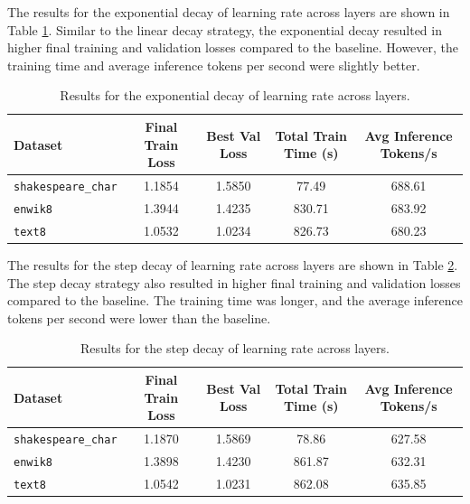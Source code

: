 \documentclass{article} %
\begin{document}
The results for the exponential decay of learning rate across layers are shown in Table \ref{tab:exponential-decay-results}. Similar to the linear decay strategy, the exponential decay resulted in higher final training and validation losses compared to the baseline. However, the training time and average inference tokens per second were slightly better.

\begin{table}[h]
    \centering
    \begin{tabular}{lcccc}
        \toprule
        Dataset & Final Train Loss & Best Val Loss & Total Train Time (s) & Avg Inference Tokens/s \\
        \midrule
        \texttt{shakespeare\_char} & 1.1854 & 1.5850 & 77.49 & 688.61 \\
        \texttt{enwik8} & 1.3944 & 1.4235 & 830.71 & 683.92 \\
        \texttt{text8} & 1.0532 & 1.0234 & 826.73 & 680.23 \\
        \bottomrule
    \end{tabular}
    \caption{Results for the exponential decay of learning rate across layers.}
    \label{tab:exponential-decay-results}
\end{table}

The results for the step decay of learning rate across layers are shown in Table \ref{tab:step-decay-results}. The step decay strategy also resulted in higher final training and validation losses compared to the baseline. The training time was longer, and the average inference tokens per second were lower than the baseline.

\begin{table}[h]
    \centering
    \begin{tabular}{lcccc}
        \toprule
        Dataset & Final Train Loss & Best Val Loss & Total Train Time (s) & Avg Inference Tokens/s \\
        \midrule
        \texttt{shakespeare\_char} & 1.1870 & 1.5869 & 78.86 & 627.58 \\
        \texttt{enwik8} & 1.3898 & 1.4230 & 861.87 & 632.31 \\
        \texttt{text8} & 1.0542 & 1.0231 & 862.08 & 635.85 \\
        \bottomrule
    \end{tabular}
    \caption{Results for the step decay of learning rate across layers.}
    \label{tab:step-decay-results}
\end{table}
\end{document}
